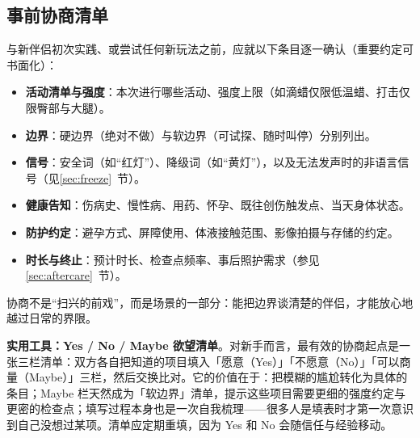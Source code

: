 \documentclass[12pt,UTF8]{ctexbook}
\begin{document}
\subsection{事前协商清单}

与新伴侣初次实践、或尝试任何新玩法之前，应就以下条目逐一确认（重要约定可书面化）：

\begin{itemize}
\item \textbf{活动清单与强度}：本次进行哪些活动、强度上限（如滴蜡仅限低温蜡、打击仅限臀部与大腿）。
\item \textbf{边界}：硬边界（绝对不做）与软边界（可试探、随时叫停）分别列出。
\item \textbf{信号}：安全词（如“红灯”）、降级词（如“黄灯”），以及无法发声时的非语言信号（见\ref{sec:freeze}~节）。
\item \textbf{健康告知}：伤病史、慢性病、用药、怀孕、既往创伤触发点、当天身体状态。
\item \textbf{防护约定}：避孕方式、屏障使用、体液接触范围、影像拍摄与存储的约定。
\item \textbf{时长与终止}：预计时长、检查点频率、事后照护需求（参见\ref{sec:aftercare}~节）。
\end{itemize}

协商不是“扫兴的前戏”，而是场景的一部分：能把边界谈清楚的伴侣，才能放心地越过日常的界限。

\textbf{实用工具：Yes / No / Maybe 欲望清单}。对新手而言，最有效的协商起点是一张三栏清单：双方各自把知道的项目填入「愿意（Yes）」「不愿意（No）」「可以商量（Maybe）」三栏，然后交换比对。它的价值在于：把模糊的尴尬转化为具体的条目；Maybe 栏天然成为「软边界」清单，提示这些项目需要更细的强度约定与更密的检查点；填写过程本身也是一次自我梳理——很多人是填表时才第一次意识到自己没想过某项。清单应定期重填，因为 Yes 和 No 会随信任与经验移动。
\end{document}
